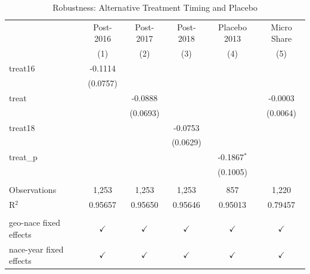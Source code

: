 \begin{table}[htbp]
   \caption{\label{tab:robustness} Robustness: Alternative Treatment Timing and Placebo}
   \bigskip
   \centering
   \begin{tabular}{lccccc}
      \toprule
                              & Post-2016     & Post-2017     & Post-2018     & Placebo 2013  & Micro Share \\   
                              & (1)           & (2)           & (3)           & (4)           & (5)\\  
      \midrule 
      treat16                 & -0.1114       &               &               &               &   \\   
                              & (0.0757)      &               &               &               &   \\   
      treat                   &               & -0.0888       &               &               & -0.0003\\   
                              &               & (0.0693)      &               &               & (0.0064)\\   
      treat18                 &               &               & -0.0753       &               &   \\   
                              &               &               & (0.0629)      &               &   \\   
      treat\_p                &               &               &               & -0.1867$^{*}$ &   \\   
                              &               &               &               & (0.1005)      &   \\   
       \\
      Observations            & 1,253         & 1,253         & 1,253         & 857           & 1,220\\  
      R$^2$                   & 0.95657       & 0.95650       & 0.95646       & 0.95013       & 0.79457\\  
       \\
      geo-nace fixed effects  & $\checkmark$  & $\checkmark$  & $\checkmark$  & $\checkmark$  & $\checkmark$\\   
      nace-year fixed effects & $\checkmark$  & $\checkmark$  & $\checkmark$  & $\checkmark$  & $\checkmark$\\   
      \bottomrule
   \end{tabular}
\end{table}
